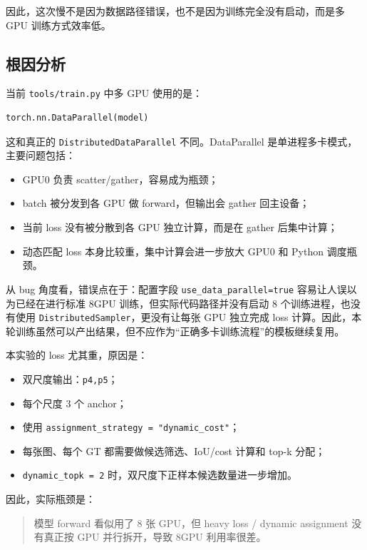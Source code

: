 \documentclass[UTF8]{ctexart}
\begin{document}
因此，这次慢不是因为数据路径错误，也不是因为训练完全没有启动，而是多 GPU 训练方式效率低。

\subsection{根因分析}

当前 \texttt{tools/train.py} 中多 GPU 使用的是：

\begin{verbatim}
torch.nn.DataParallel(model)
\end{verbatim}

这和真正的 \texttt{DistributedDataParallel} 不同。DataParallel 是单进程多卡模式，主要问题包括：

\begin{itemize}[leftmargin=2em]
  \item GPU0 负责 scatter/gather，容易成为瓶颈；
  \item batch 被分发到各 GPU 做 forward，但输出会 gather 回主设备；
  \item 当前 loss 没有被分散到各 GPU 独立计算，而是在 gather 后集中计算；
  \item 动态匹配 loss 本身比较重，集中计算会进一步放大 GPU0 和 Python 调度瓶颈。
\end{itemize}

从 bug 角度看，错误点在于：配置字段 \texttt{use\_data\_parallel=true} 容易让人误以为已经在进行标准 8GPU 训练，但实际代码路径并没有启动 8 个训练进程，也没有使用 \texttt{DistributedSampler}，更没有让每张 GPU 独立完成 loss 计算。因此，本轮训练虽然可以产出结果，但不应作为“正确多卡训练流程”的模板继续复用。

本实验的 loss 尤其重，原因是：

\begin{itemize}[leftmargin=2em]
  \item 双尺度输出：\texttt{p4,p5}；
  \item 每个尺度 3 个 anchor；
  \item 使用 \texttt{assignment\_strategy = "dynamic\_cost"}；
  \item 每张图、每个 GT 都需要做候选筛选、IoU/cost 计算和 top-k 分配；
  \item \texttt{dynamic\_topk = 2} 时，双尺度下正样本候选数量进一步增加。
\end{itemize}

因此，实际瓶颈是：

\begin{quote}
模型 forward 看似用了 8 张 GPU，但 heavy loss / dynamic assignment 没有真正按 GPU 并行拆开，导致 8GPU 利用率很差。
\end{quote}
\end{document}
